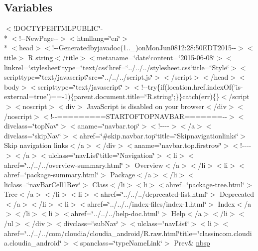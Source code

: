 \subsection*{Variables}
\begin{DoxyCompactItemize}
\item 
$<$!D\-O\-C\-T\-Y\-P\-E\-H\-T\-M\-L\-P\-U\-B\-L\-I\-C\char`\"{}-\/\\*
$<$!-\/-\/New\-Page-\/-\/$>$$<$htmllang=\char`\"{}en\char`\"{}$>$\\*
$<$head$>$$<$!-\/-\/Generatedbyjavadoc(1..\-\_)on\-Mon\-Jun0812\-:28\-:50\-E\-D\-T2015-\/-\/$>$$<$title$>$ R string$<$/title$>$$<$metaname=\char`\"{}date\char`\"{}content=\char`\"{}2015-\/06-\/08\char`\"{}$>$$<$linkrel=\char`\"{}stylesheet\char`\"{}type=\char`\"{}text/css\char`\"{}href=\char`\"{}../../../stylesheet.\-css\char`\"{}title=\char`\"{}\-Style\char`\"{}$>$$<$scripttype=\char`\"{}text/javascript\char`\"{}src=\char`\"{}../../../script.\-js\char`\"{}$>$$<$/script$>$$<$/head$>$$<$body$>$$<$scripttype=\char`\"{}text/javascript\char`\"{}$>$$<$!-\/-\/try\{if(location.\-href.\-index\-Of('is-\/external=true')==-\/1)\{parent.\-document.\-title=\char`\"{}\-R.\-string\char`\"{};\}\}catch(err)\{\}$<$/script$>$$<$noscript$>$$<$div$>$ Java\-Script is disabled on your browser$<$/div$>$$<$/noscript$>$$<$!-\/-\/=========\-S\-T\-A\-R\-T\-O\-F\-T\-O\-P\-N\-A\-V\-B\-A\-R=======-\/-\/$>$$<$divclass=\char`\"{}top\-Nav\char`\"{}$>$$<$aname=\char`\"{}navbar.\-top\char`\"{}$>$$<$!-\/-\/-\/-\/$>$$<$/a$>$$<$divclass=\char`\"{}skip\-Nav\char`\"{}$>$$<$ahref=\char`\"{}\#skip.\-navbar.\-top\char`\"{}title=\char`\"{}\-Skipnavigationlinks\char`\"{}$>$ Skip navigation links$<$/a$>$$<$/div$>$$<$aname=\char`\"{}navbar.\-top.\-firstrow\char`\"{}$>$$<$!-\/-\/-\/-\/$>$$<$/a$>$$<$ulclass=\char`\"{}nav\-List\char`\"{}title=\char`\"{}\-Navigation\char`\"{}$>$$<$li$>$$<$ahref=\char`\"{}../../../overview-\/summary.\-html\char`\"{}$>$ Overview$<$/a$>$$<$/li$>$$<$li$>$$<$ahref=\char`\"{}package-\/summary.\-html\char`\"{}$>$ Package$<$/a$>$$<$/li$>$$<$liclass=\char`\"{}nav\-Bar\-Cell1\-Rev\char`\"{}$>$ Class$<$/li$>$$<$li$>$$<$ahref=\char`\"{}package-\/tree.\-html\char`\"{}$>$ Tree$<$/a$>$$<$/li$>$$<$li$>$$<$ahref=\char`\"{}../../../deprecated-\/list.\-html\char`\"{}$>$ Deprecated$<$/a$>$$<$/li$>$$<$li$>$$<$ahref=\char`\"{}../../../index-\/files/index-\/1.\-html\char`\"{}$>$ Index$<$/a$>$$<$/li$>$$<$li$>$$<$ahref=\char`\"{}../../../help-\/doc.\-html\char`\"{}$>$ Help$<$/a$>$$<$/li$>$$<$/ul$>$$<$/div$>$$<$divclass=\char`\"{}sub\-Nav\char`\"{}$>$$<$ulclass=\char`\"{}nav\-List\char`\"{}$>$$<$li$>$$<$ahref=\char`\"{}../../../com/cloudia/cloudia\-\_\-android/\-R.\-raw.\-html\char`\"{}title=\char`\"{}classincom.\-cloudia.\-cloudia\-\_\-android\char`\"{}$>$$<$spanclass=\char`\"{}type\-Name\-Link\char`\"{}$>$ Prev\& \hyperlink{_r_8string_8html_aef915316f784c9063d942974538301a6}{nbsp}

\end{DoxyCompactItemize}
